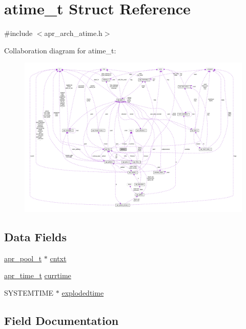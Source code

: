 \hypertarget{structatime__t}{}\section{atime\+\_\+t Struct Reference}
\label{structatime__t}


{\ttfamily \#include $<$apr\+\_\+arch\+\_\+atime.\+h$>$}



Collaboration diagram for atime\+\_\+t\+:
\nopagebreak
\begin{figure}[H]
\begin{center}
\leavevmode
\includegraphics[width=350pt]{structatime__t__coll__graph}
\end{center}
\end{figure}
\subsection*{Data Fields}
\begin{DoxyCompactItemize}
\item 
\hyperlink{structapr__pool__t}{apr\+\_\+pool\+\_\+t} $\ast$ \hyperlink{structatime__t_a044503913be52273e8af26faed71b3b0}{cntxt}
\item 
\hyperlink{group__apr__time_gadb4bde16055748190eae190c55aa02bb}{apr\+\_\+time\+\_\+t} \hyperlink{structatime__t_a653999daf44e25a51b89ed6d41fdb046}{currtime}
\item 
S\+Y\+S\+T\+E\+M\+T\+I\+ME $\ast$ \hyperlink{structatime__t_a1bf50d7bf5fd446531357c3b0a33eabf}{explodedtime}
\end{DoxyCompactItemize}


\subsection{Field Documentation}
